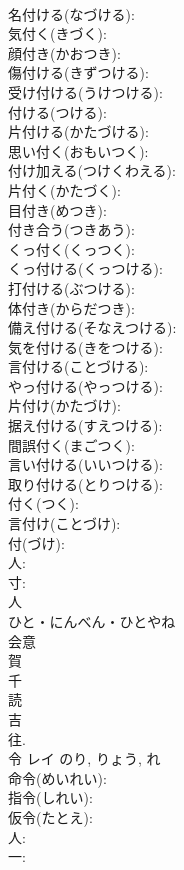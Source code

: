 \documentclass[8pt]{extreport}
\begin{document}
\begin{CJK}{UTF8}{min}
\\	名付ける(なづける): 
\\	気付く(きづく): 
\\	顔付き(かおつき): 
\\	傷付ける(きずつける): 
\\	受け付ける(うけつける): 
\\	付ける(つける): 
\\	片付ける(かたづける): 
\\	思い付く(おもいつく): 
\\	付け加える(つけくわえる): 
\\	片付く(かたづく): 
\\	目付き(めつき): 
\\	付き合う(つきあう): 
\\	くっ付く(くっつく): 
\\	くっ付ける(くっつける): 
\\	打付ける(ぶつける): 
\\	体付き(からだつき): 
\\	備え付ける(そなえつける): 
\\	気を付ける(きをつける): 
\\	言付ける(ことづける): 
\\	やっ付ける(やっつける): 
\\	片付け(かたづけ): 
\\	据え付ける(すえつける): 
\\	間誤付く(まごつく): 
\\	言い付ける(いいつける): 
\\	取り付ける(とりつける): 
\\	付く(つく): 
\\	言付け(ことづけ): 
\\	付(づけ): 
\\	人: 
\\	寸: 
\\	人	
\\	ひと・にんべん・ひとやね	
\\	会意 
\\	賀 
\\	千 
\\	読
\\	吉 
\\	往. 
\\	令	レイ		のり, りょう, れ	
\\	命令(めいれい): 
\\	指令(しれい): 
\\	仮令(たとえ): 
\\	人: 
\\	一: 

\end{CJK}
\end{document}
